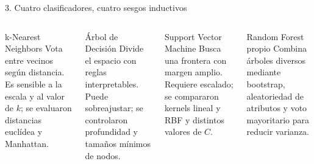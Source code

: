 \documentclass[aspectratio=169,10pt]{beamer}
\begin{document}
\begin{frame}{3. Cuatro clasificadores, cuatro sesgos inductivos}
  \begin{columns}[T,onlytextwidth]
      \begin{block}{k-Nearest Neighbors}
        Vota entre vecinos según distancia. Es sensible a la escala y al valor
        de \(k\); se evaluaron distancias euclídea y Manhattan.
      \end{block}
      \begin{block}{Árbol de Decisión}
        Divide el espacio con reglas interpretables. Puede sobreajustar; se
        controlaron profundidad y tamaños mínimos de nodos.
      \end{block}
      \begin{block}{Support Vector Machine}
        Busca una frontera con margen amplio. Requiere escalado; se compararon
        kernels lineal y RBF y distintos valores de \(C\).
      \end{block}
      \begin{block}{Random Forest propio}
        Combina árboles diversos mediante bootstrap, aleatoriedad de atributos
        y voto mayoritario para reducir varianza.
      \end{block}
  \end{columns}
\end{frame}
\end{document}
